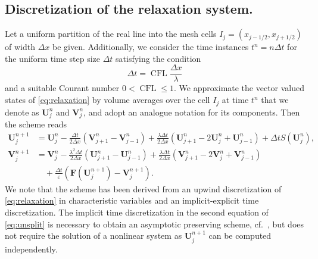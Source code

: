 \documentclass[a4paper,11pt]{article}
\newcommand{\CFL}{\operatorname{CFL}}
\begin{document}
\subsection{Discretization of the relaxation system.} Let a uniform partition of the real line into the mesh cells $I_j=(x_{j-1/2}, x_{j+1/2})$ of width $\Delta x$ be given. Additionally, we consider the time instances $t^n= n \Delta t$ for the uniform time step size $\Delta t$ satisfying the condition
\begin{equation}\label{eq:time-discretization}
  \Delta t= \CFL \frac{\Delta x}{\lambda}
\end{equation}
and a suitable Courant number $0<\CFL \leq 1$. We approximate the vector valued states of \eqref{eq:relaxation} by volume averages over the cell $I_j$ at time $t^n$ that we denote as $\mathbf U_j^n$ and $\mathbf V_j^n$, and adopt an analogue notation for its components. Then the scheme reads
\begin{equation}\label{eq:unsplit}
\begin{aligned}
  \mathbf U_j^{n+1} &= \mathbf U_j^n - \frac{\Delta t}{ 2 \Delta x}\left( \mathbf V^{n}_{j+1} - \mathbf V^{n}_{j-1}\right) + \frac{\lambda \Delta t}{2 \Delta x} \left(\mathbf U_{j+1}^n - 2 \mathbf U_j^n + \mathbf U_{j-1}^n \right) + \Delta t S(\mathbf U_j^n), \\
  \mathbf V_j^{n+1} &= \mathbf V_j^{n} - \frac{\lambda^2 \Delta t}{ 2 \Delta x}\left( \mathbf U^{n}_{j+1} - \mathbf U^{n}_{j-1}\right) + \frac{\lambda \Delta t}{2 \Delta x} \left(\mathbf V_{j+1}^{n} - 2 \mathbf V_j^{n} + \mathbf V_{j-1}^{n} \right) \\
  &\quad + \frac{\Delta t}{\varepsilon} \left(\mathbf F (\mathbf U_j^{n+1}) - \mathbf V_j^{n+1}\right).
\end{aligned}
\end{equation}
We note that the scheme has been derived from an upwind discretization of \eqref{eq:relaxation} in characteristic variables and an implicit-explicit time discretization. The implicit time discretization in the second equation of \eqref{eq:unsplit} is necessary to obtain an asymptotic preserving scheme, cf.~\cite{hu2017asymppreserschem}, but does not require the solution of a nonlinear system as $\mathbf U_j^{n+1}$ can be computed independently.
\end{document}
